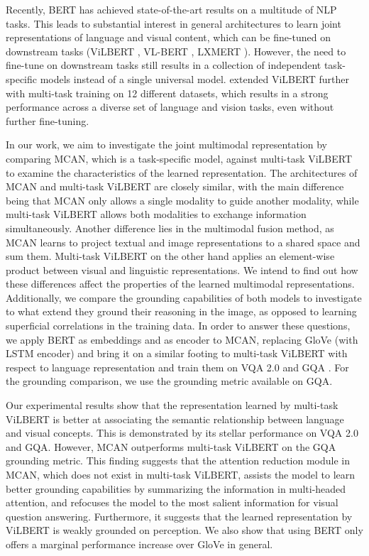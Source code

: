 \documentclass{article}
\begin{document}
Recently, BERT \citep{devlin-etal-2019-bert} has achieved state-of-the-art results on a multitude of NLP tasks. This leads to substantial interest in general architectures to learn joint representations of language and visual content, which can be fine-tuned on downstream tasks (ViLBERT \citep{lu2019vilbert}, VL-BERT \citep{Su2020VL-BERT}, LXMERT \citep{tan2019lxmert}). However, the need to fine-tune on downstream tasks still results in a collection of independent task-specific models instead of a single universal model. \citet{lu2020multitask} extended ViLBERT further with multi-task training on 12 different datasets, which results in a strong performance across a diverse set of language and vision tasks, even without further fine-tuning.

In our work, we aim to investigate the joint multimodal representation by comparing MCAN, which is a task-specific model, against multi-task ViLBERT to examine the characteristics of the learned representation. The architectures of MCAN and multi-task ViLBERT are closely similar, with the main difference being that MCAN only allows a single modality to guide another modality, while multi-task ViLBERT allows both modalities to exchange information simultaneously. Another difference lies in the multimodal fusion method, as MCAN learns to project textual and image representations to a shared space and sum them. Multi-task ViLBERT on the other hand applies an element-wise product between visual and linguistic representations. We intend to find out how these differences affect the properties of the learned multimodal representations. Additionally, we compare the grounding capabilities of both models to investigate to what extend they ground their reasoning in the image, as opposed to learning superficial correlations in the training data. In order to answer these questions, we apply BERT as embeddings and as encoder to MCAN, replacing GloVe \citep{pennington2014glove} (with LSTM encoder) and bring it on a similar footing to multi-task ViLBERT with respect to language representation and train them on VQA 2.0 \citep{goyal2017vqa2} and GQA \citep{hudson2019gqa}. For the grounding comparison, we use the grounding metric available on GQA.

Our experimental results show that the representation learned by multi-task ViLBERT is better at associating the semantic relationship between language and visual concepts. This is demonstrated by its stellar performance on VQA 2.0 and GQA.  However, MCAN outperforms multi-task ViLBERT on the GQA grounding metric. This finding suggests that the attention reduction module in MCAN, which does not exist in multi-task ViLBERT, assists the model to learn better grounding capabilities by summarizing the information in multi-headed attention, and refocuses the model to the most salient information for visual question answering. Furthermore, it suggests that the learned representation by ViLBERT is weakly grounded on perception. We also show that using BERT only offers a marginal performance increase over GloVe in general.
\end{document}
